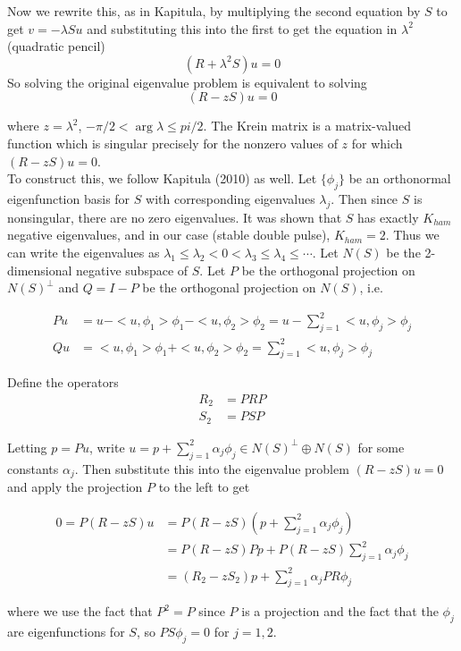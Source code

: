 \documentclass[12pt]{article}
\begin{document}
Now we rewrite this, as in Kapitula, by multiplying the second equation by $S$ to get $v = -\lambda S u$ and substituting this into the first to get the equation in $\lambda^2$ (quadratic pencil)
\[
(R + \lambda^2 S)u = 0
\]
So solving the original eigenvalue problem is equivalent to solving
\[
(R - zS)u = 0
\]

where $z = \lambda^2$, $-\pi/2 < \arg \lambda \leq pi/2$. The Krein matrix is a matrix-valued function which is singular precisely for the nonzero values of $z$ for which $(R - zS)u = 0$.\\

To construct this, we follow Kapitula (2010) as well. Let $\{\phi_j\}$ be an orthonormal eigenfunction basis for $S$ with corresponding eigenvalues $\lambda_j$. Then since $S$ is nonsingular, there are no zero eigenvalues. It was shown that $S$ has exactly $K_{ham}$ negative eigenvalues, and in our case (stable double pulse), $K_{ham} = 2$. Thus we can write the eigenvalues as $\lambda_1 \leq \lambda_2 < 0 < \lambda_3 \leq \lambda_4 \leq \cdots$. Let $N(S)$ be the 2-dimensional negative subspace of $S$. Let $P$ be the orthogonal projection on $N(S)^\perp$ and $Q = I - P$ be the orthogonal projection on $N(S)$, i.e.

\begin{align}
Pu &= u - <u,\phi_1>\phi_1 - <u, \phi_2>\phi_2 = u - \sum_{j=1}^2 <u, \phi_j>\phi_j\\
Qu &= <u,\phi_1>\phi_1 + <u, \phi_2>\phi_2 = \sum_{j=1}^2 <u, \phi_j>\phi_j
\end{align}

Define the operators
\begin{align}
R_2 &= PRP \\
S_2 &= PSP
\end{align}

Letting $p = Pu$, write $u = p + \sum_{j=1}^2 \alpha_j \phi_j \in N(S)^\perp \oplus N(S)$ for some constants $\alpha_j$. Then substitute this into the eigenvalue problem $(R - zS)u = 0$ and apply the projection $P$ to the left to get

\begin{align}
0 = P(R - zS)u &= P(R - zS)(p + \sum_{j=1}^2 \alpha_j \phi_j) \\
&= P(R - zS)Pp + P(R - zS)\sum_{j=1}^2 \alpha_j \phi_j \\
&= (R_2 - z S_2)p + \sum_{j=1}^2 \alpha_j P R \phi_j
\end{align}

where we use the fact that $P^2 = P$ since $P$ is a projection and the fact that the $\phi_j$ are eigenfunctions for $S$, so $P S\phi_j = 0$ for $j = 1, 2$.\\
\end{document}
